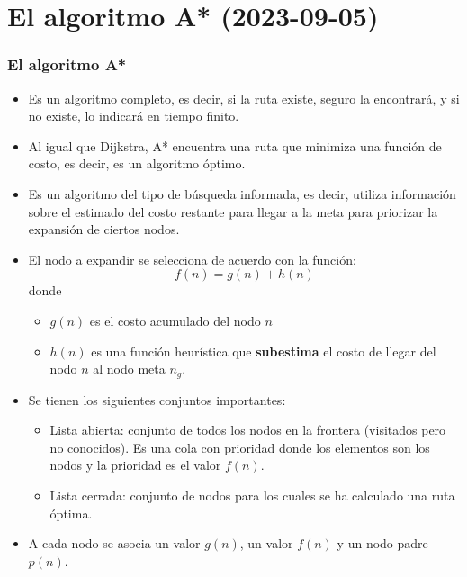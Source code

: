 \section{El algoritmo A* (2023-09-05)}

\begin{frame}\frametitle{El algoritmo A*}
  \begin{itemize}
  \item Es un algoritmo completo, es decir, si la ruta existe, seguro la encontrará, y si no existe, lo indicará en tiempo finito.
  \item Al igual que Dijkstra, A* encuentra una ruta que minimiza una función de costo, es decir, es un algoritmo óptimo.
  \item Es un algoritmo del tipo de búsqueda informada, es decir, utiliza información sobre el estimado del costo restante para llegar a la meta para priorizar la expansión de ciertos nodos. 
  \item El nodo a expandir se selecciona de acuerdo con la función:
    \[f(n) = g(n) + h(n)\]
    donde
    \begin{itemize}
    \item $g(n)$ es el costo acumulado del nodo $n$
    \item $h(n)$ es una función heurística que \textbf{subestima} el costo de llegar del nodo $n$ al nodo meta $n_g$. 
    \end{itemize}
  \item Se tienen los siguientes conjuntos importantes:
    \begin{itemize}
    \item Lista abierta: conjunto de todos los nodos en la frontera (visitados pero no conocidos). Es una cola con prioridad donde los elementos son los nodos y la prioridad es el valor $f(n)$.
    \item Lista cerrada: conjunto de nodos para los cuales se ha calculado una ruta óptima. 
    \end{itemize}
    \item A cada nodo se asocia un valor $g(n)$, un valor $f(n)$ y un nodo padre $p(n)$. 
  \end{itemize}
\end{frame}

